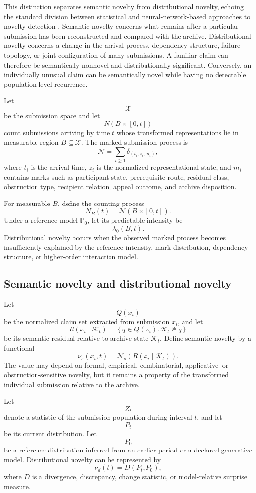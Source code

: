 \documentclass[11pt]{article}
\theoremstyle{definition}
\newcommand{\K}{\mathcal{K}}
\begin{document}
This distinction separates semantic novelty from distributional novelty, echoing the standard division between statistical and neural-network-based approaches to novelty detection \cite{markou2003a,markou2003b}. Semantic novelty concerns what remains after a particular submission has been reconstructed and compared with the archive. Distributional novelty concerns a change in the arrival process, dependency structure, failure topology, or joint configuration of many submissions. A familiar claim can therefore be semantically nonnovel and distributionally significant. Conversely, an individually unusual claim can be semantically novel while having no detectable population-level recurrence.

Let
\[
\mathcal{X}
\]
be the submission space and let
\[
N(B\times[0,t])
\]
count submissions arriving by time \(t\) whose transformed representations lie in measurable region \(B\subseteq\mathcal{X}\). The marked submission process is
\[
\mathcal{N}
=
\sum_{i\geq1}
\delta_{(t_i,z_i,m_i)},
\]
where \(t_i\) is the arrival time, \(z_i\) is the normalized representational state, and \(m_i\) contains marks such as participant state, prerequisite route, residual class, obstruction type, recipient relation, appeal outcome, and archive disposition.

For measurable \(B\), define the counting process
\[
N_B(t)
=
\mathcal{N}(B\times[0,t]).
\]
Under a reference model \(\mathbb{P}_0\), let its predictable intensity be
\[
\lambda_0(B,t).
\]
Distributional novelty occurs when the observed marked process becomes insufficiently explained by the reference intensity, mark distribution, dependency structure, or higher-order interaction model.

\subsection{Semantic novelty and distributional novelty}

Let
\[
Q(x_i)
\]
be the normalized claim set extracted from submission \(x_i\), and let
\[
R(x_i\mid\K_t)
=
\left\{
q\in Q(x_i):\K_t\nvDash q
\right\}
\]
be its semantic residual relative to archive state \(\K_t\). Define semantic novelty by a functional
\[
\nu_s(x_i,t)
=
\mathcal{N}_s\!\left(
R(x_i\mid\K_t)
\right).
\]
The value may depend on formal, empirical, combinatorial, applicative, or obstruction-sensitive novelty, but it remains a property of the transformed individual submission relative to the archive.

Let
\[
Z_t
\]
denote a statistic of the submission population during interval \(t\), and let
\[
P_t
\]
be its current distribution. Let
\[
P_0
\]
be a reference distribution inferred from an earlier period or a declared generative model. Distributional novelty can be represented by
\[
\nu_d(t)
=
D(P_t,P_0),
\]
where \(D\) is a divergence, discrepancy, change statistic, or model-relative surprise measure.
\end{document}
